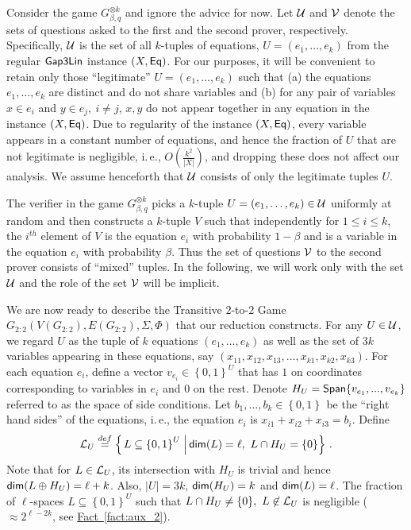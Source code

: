 \documentclass[11pt]{article}
\numberwithin{equation}{section}
\theoremstyle{definition}
\theoremstyle{plain}
\newcommand{\ie}{i.\,e.}
\newcommand{\expref}[2]{\hyperref[#2]{#1~\ref{#2}}}
\newcommand\sett[2]{\left\{ \left. #1 \;\right\vert #2 \right\}}
\newcommand\set[1]{{\left\{ #1 \right\}}}
\newcommand\power[1]{\set{0,1}^{#1}}
\newcommand\defeq{\stackrel{def}{=}}
\newcommand*\xor{\mathbin{\oplus}}
\renewcommand\leq{\leqslant}
\begin{document}
Consider the game $G_{\beta, q}^{\otimes k}$ and ignore the advice for now.
Let ${\cal U}$ and ${\cal V}$ denote the sets of questions asked to the first and the second prover, respectively.  %
Specifically, ${\cal U}$
is the set of all $k$-tuples of equations, $U = (e_1, \ldots, e_k)$ from the regular ${\sf Gap3Lin}$
instance $(X, {\sf Eq})$.
For our purposes, it will be convenient to retain only those ``legitimate'' $U = (e_1, \ldots, e_k)$ such that (a) the equations
 $e_1, \ldots, e_k$ are distinct and do not share variables and (b) for any pair of variables $x \in e_i$ and
 $y \in e_j, ~i\neq  j$, $x, y$ do not appear together in any equation in the instance $(X, {\sf Eq})$. Due to
 regularity of the instance $(X, {\sf Eq})$, every variable appears in a constant number of equations, and hence
 the fraction of $U$ that are not legitimate is negligible, \ie, $O(\frac{k^2}{|X|})$, and dropping these does
 not affect our analysis. We assume henceforth that ${\cal U}$ consists of only the legitimate  tuples $U$.

 The verifier in the game $G_{\beta, q}^{\otimes k}$ picks a $k$-tuple $U = (e_1,\ldots, e_k) \in {\cal U}$ uniformly at random
 and then constructs a $k$-tuple $V$ such that independently for $1 \leq i \leq k$, the $i^{th}$ element of
 $V$ is the equation $e_i$ with probability $1-\beta$ and is a variable in the equation $e_i$ with probability $\beta$.
 Thus the set of questions ${\cal V}$ to the second prover consists of ``mixed'' tuples. In the following, we will work
 only with the set ${\cal U}$ and the role of the set ${\cal V}$ will be implicit.





We are now ready to describe the Transitive $2$-to-$2$ Game $G_{2:2} ( V(G_{2:2}), E(G_{2:2}), \Sigma, \Phi)$ that our
 reduction constructs. For any $U \in {\cal U}$, we regard $U$ as the tuple of $k$ equations $(e_1,\ldots, e_k)$ as well
 as the set of $3k$ variables appearing in these equations, say $(x_{11}, x_{12}, x_{13}, \ldots, x_{k1}, x_{k2}, x_{k3})$.
For each equation $e_i$, define a vector $v_{e_i}\in \power{U}$ that has $1$ on coordinates corresponding
to variables in $e_i$ and $0$ on the rest.
Denote $H_U={\sf Span}{\set{v_{e_1},...,v_{e_k}}}$ referred to as the space of side conditions. Let $b_1, \ldots, b_k \in \power{}$
be the ``right hand sides'' of the equations, \ie, the equation $e_i$ is $x_{i1} + x_{i2} + x_{i3} = b_i$. Define
\[
{\cal L}_U\defeq \sett{L\subseteq \power{U}}{{\sf dim}(L)=\ell,  ~L \cap H_U = \{0\}}\,.%
\]
 Note that for $L \in {\cal L}_U$, its intersection with $H_U$ is trivial and hence ${\sf dim}(L \xor H_U) = \ell+k$.
 Also, $|U|=3k$, ${\sf dim}(H_U) = k$ and ${\sf dim}(L)=\ell$. The fraction of $\ell$-spaces $L \subseteq \power{U}$ such that
$L \cap H_U \neq  \{0\}, ~L \not\in {\cal L}_U$ is negligible ($\approx 2^{\ell-2k}$, see \expref{Fact}{fact:aux_2}).
\end{document}
